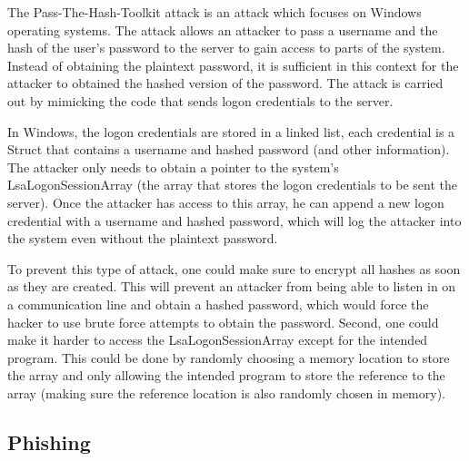 \documentclass[psamsfonts]{amsart}
\begin{document}
The Pass-The-Hash-Toolkit attack is an attack which focuses on Windows operating systems. The attack allows an attacker to pass a username and the hash of the user's password to the server to gain access to parts of the system. Instead of obtaining the plaintext password, it is sufficient in this context for the attacker to obtained the hashed version of the password. The attack is carried out by mimicking the code that sends logon credentials to the server.

In Windows, the logon credentials are stored in a linked list, each credential is a Struct that contains a username and hashed password (and other information). The attacker only needs to obtain a pointer to the system's LsaLogonSessionArray (the array that stores the logon credentials to be sent the server). Once the attacker has access to this array, he can append a new logon credential with a username and hashed password, which will log the attacker into the system even without the plaintext password.

To prevent this type of attack, one could make sure to encrypt all hashes as soon as they are created. This will prevent an attacker from being able to listen in on a communication line and obtain a hashed password, which would force the hacker to use brute force attempts to obtain the password. Second, one could make it harder to access the LsaLogonSessionArray except for the intended program. This could be done by randomly choosing a memory location to store the array and only allowing the intended program to store the reference to the array (making sure the reference location is also randomly chosen in memory).

\subsection*{Phishing}
\end{document}
